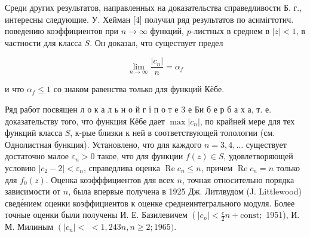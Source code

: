 \documentclass[10pt]{article}
\begin{document}
Среди других результатов, направленных на доказательства справедливости Б. г., интересны следующие. У. Хейман [4] получил ряд результатов по асимігтотич. поведению коэффициентов при $n \rightarrow \infty$ функций, $p$-листных в среднем в $|z|<1$, в частности для класса $S$. Он доказал, что существует предел



\[

\lim _{n \rightarrow \infty} \frac{\left|c_{n}\right|}{n}=\alpha_{f}

\]



и что $\alpha_{f} \leqslant 1$ со знаком равенства только для функций Кёбе.



Ряд работ посвящен л о к а л ь н о й г ї п о т е 3 е Би б е р б а х а, т. е. доказательству того, что функция Кёбе дает $\max \left|c_{n}\right|$, по крайней мере для тех функций класса $S$, к-рые близки к ней в соответствующей топологии (см. Однолистная бункция). Установлено, что для каждого $n=3,4, \ldots$ существует достаточно малое $\varepsilon_{n}>0$ такое, что для функции $f(z) \in S$, удовлетворяющей условию $\left|c_{2}-2\right|<\varepsilon_{n}$, справедлива оценка $\operatorname{Re} c_{n} \leqslant n$, причем $\operatorname{Re} c_{n}=n$ только для $f_{0}(z)$. Оценка коэфффициентов для всех $n$, точная относительно порядка зависимости от $n$, была впервые получена в 1925 Дж. Литлвудом (J. Littlewood) сведе́нием оценки коэффициентов к оценке среднеинтегрального модуля. Более точные оценки были получены И. Е. Базилевичем $\left(\left|c_{n}\right|<\frac{e}{2} n+\mathrm{const;}\right.$ 1951), И. М. Милиным $\left(\left|c_{n}\right|<\right.$ $<1,243 n, n \geqslant 2 ; 1965)$.
\end{document}
